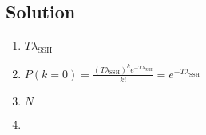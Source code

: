 \subsection*{Solution}

\begin{enumerate}
    \item $T \lambda_{\text{SSH}}$
    \item $P(k = 0) = \frac{(T \lambda_{\text{SSH}})^k e^{-T \lambda_{\text{SSH}}}}{k!} = e^{-T \lambda_{\text{SSH}}}$
    \item $N$
    \item
\end{enumerate}